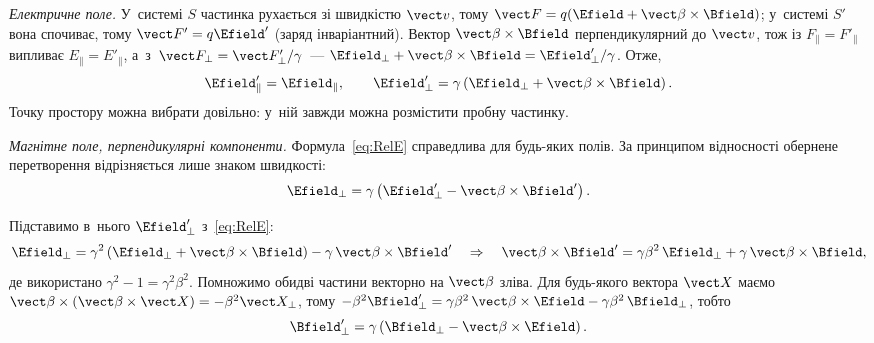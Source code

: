 \emph{Електричне поле.} У~системі $S$ частинка рухається зі швидкістю $\vect v$, тому
$\vect F = q(\Efield + \vect\beta\times\Bfield)$; у~системі $S'$ вона спочиває, тому
$\vect F' = q\Efield'$ (заряд інваріантний). Вектор $\vect\beta\times\Bfield$
перпендикулярний до $\vect v$, тож із $F_\parallel = F'_\parallel$ випливає $E_\parallel =
E'_\parallel$, а~з~$\vect F_\perp = \vect F'_\perp/\gamma$~--- $\Efield_\perp +
\vect\beta\times\Bfield = \Efield'_\perp/\gamma$. Отже,
\begin{equation}\label{eq:RelE}
	\Efield'_\parallel = \Efield_\parallel, \qquad \Efield'_\perp =
	\gamma\left(\Efield_\perp + \vect\beta\times\Bfield\right).
\end{equation}
Точку простору можна вибрати довільно: у~ній завжди можна розмістити
пробну частинку.

\emph{Магнітне поле, перпендикулярні компоненти.} Формула~\eqref{eq:RelE} справедлива для
будь-яких полів. За принципом відносності обернене перетворення відрізняється лише знаком
швидкості: 
\begin{equation*}
	\Efield_\perp = \gamma\left(\Efield'_\perp - \vect\beta\times\Bfield'\right).
\end{equation*}


Підставимо в~нього $\Efield'_\perp$ з~\eqref{eq:RelE}:
\begin{equation*}
	\Efield_\perp = \gamma^2\left(\Efield_\perp + \vect\beta\times\Bfield\right) -
	\gamma\,\vect\beta\times\Bfield' \quad\Rightarrow\quad \vect\beta\times\Bfield' =
	\gamma\beta^2\,\Efield_\perp + \gamma\,\vect\beta\times\Bfield,
\end{equation*}
де використано $\gamma^2 - 1 = \gamma^2\beta^2$. Помножимо обидві частини векторно на
$\vect\beta$ зліва. Для будь-якого вектора $\vect X$ маємо
$\vect\beta\times(\vect\beta\times\vect X) = -\beta^2\vect X_\perp$, тому
$-\beta^2\Bfield'_\perp = \gamma\beta^2\,\vect\beta\times\Efield -
\gamma\beta^2\,\Bfield_\perp$, тобто
\begin{equation}\label{eq:RelBperp}
	\Bfield'_\perp = \gamma\left(\Bfield_\perp - \vect\beta\times\Efield\right).
\end{equation}

